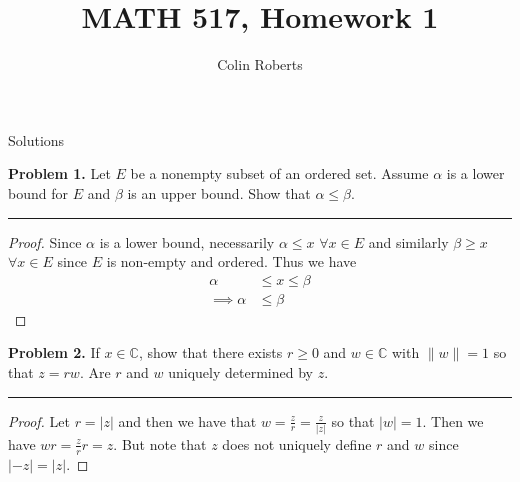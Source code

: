 \documentclass[leqno]{article}
\author{Colin Roberts}
\title{MATH 517, Homework 1}
\theoremstyle{nonumberplain}
\newtheorem{proof}{Proof}
\begin{document}
\maketitle
\begin{large}
\begin{center}
Solutions
\end{center}
\end{large}
\pagebreak


\noindent\textbf{Problem 1.} Let $E$ be a nonempty subset of an ordered set. Assume $\alpha$ is a lower bound for $E$ and $\beta$ is an upper bound. Show that $\alpha\leq \beta$.

\noindent\rule[0.5ex]{\linewidth}{1pt}

\begin{proof}
Since $\alpha$ is a lower bound, necessarily $\alpha \leq x$ $\forall x \in E$ and similarly $\beta\geq x$ $\forall x\in E$ since $E$ is non-empty and ordered. Thus we have 
\begin{align*}
\alpha &\leq x \leq \beta\\
\implies \alpha &\leq \beta
\end{align*}
\end{proof}

\pagebreak



\noindent\textbf{Problem 2.} If $x\in \mathbb{C}$, show that there exists $r\geq 0$ and $w\in \mathbb{C}$ with $\|w\|=1$ so that $z=rw$. Are $r$ and $w$ uniquely determined by $z$.

\noindent\rule[0.5ex]{\linewidth}{1pt}

\begin{proof}
Let $r=|z|$ and then we have that $w=\frac{z}{r}=\frac{z}{|z|}$ so that $|w|=1$. Then we have $wr=\frac{z}{r}r=z$.  But note that $z$ does not uniquely define $r$ and $w$ since $|-z|=|z|$.
\end{proof}
\end{document}
